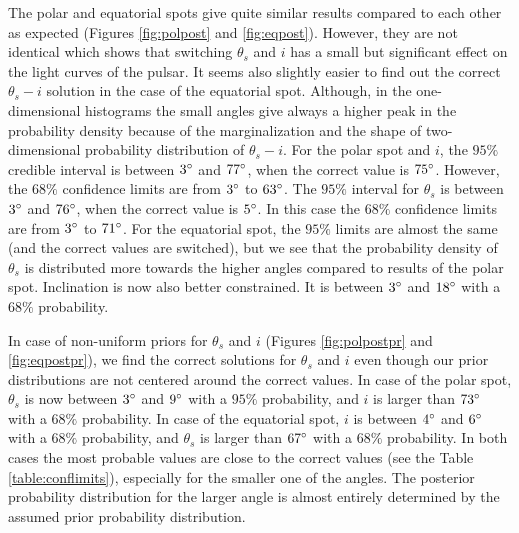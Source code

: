 \documentclass{wihuri}
\def\thetas{\theta_{s}}
\begin{document}
The polar and equatorial spots give quite similar results compared to each other as expected (Figures \ref{fig:polpost} and \ref{fig:eqpost}). However, they are not identical which shows that switching $\thetas$ and $i$ has a small but significant effect on the light curves of the pulsar. It seems also slightly easier to find out the correct $\thetas-i$ solution in the case of the equatorial spot. Although, in the one-dimensional histograms the small angles give always a higher peak in the probability density because of the marginalization and the shape of two-dimensional probability distribution of $\thetas-i$. For the polar spot and $i$, the $95 \%$ credible interval is between $3 \degree$ and $77 \degree$, when the correct value is $75 \degree$. However, the $68 \%$ confidence limits are from $3 \degree$ to $63 \degree$. The $95 \%$ interval for $\thetas$ is between $3 \degree$ and $76 \degree$, when the correct value is $5 \degree$. In this case the $68 \%$ confidence limits are from $3 \degree$ to $71 \degree$. For the equatorial spot, the $95 \%$ limits are almost the same (and the correct values are switched), but we see that the probability density of $\thetas$ is distributed more towards the higher angles compared to results of the polar spot. Inclination is now also better constrained. It is between $3 \degree$ and $18 \degree$ with a $68 \%$ probability.

In case of non-uniform priors for $\thetas$ and $i$ (Figures \ref{fig:polpostpr} and \ref{fig:eqpostpr}), we find the correct solutions for $\thetas$ and $i$ even though our prior distributions are not centered  around the correct values. In case of the polar spot, $\thetas$ is now between $3 \degree$ and $9 \degree$ with a $95 \%$ probability, and $i$ is larger than $73 \degree$ with a $68 \%$ probability. In case of the equatorial spot, $i$ is between $4 \degree$ and $6 \degree$ with a $68 \%$ probability, and $\thetas$ is larger than $67 \degree$ with a $68 \%$ probability. In both cases the most probable values are close to the correct values (see the Table \ref{table:conflimits}), especially for the smaller one of the angles. The posterior probability distribution for the larger angle is almost entirely determined by the assumed prior probability distribution.  
\end{document}
